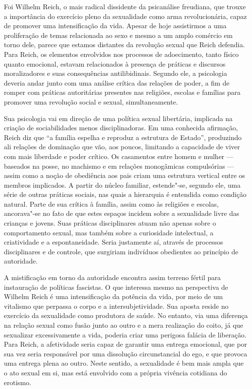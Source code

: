 Foi Wilhelm Reich, o mais radical dissidente da psicanálise freudiana,
que trouxe a importância do exercício pleno da sexualidade como arma
revolucionária, capaz de promover uma intensificação da vida. Apesar de
hoje assistirmos a uma proliferação de temas relacionada ao sexo e mesmo
a um amplo comércio em torno dele, parece que estamos distantes da
revolução sexual que Reich defendia. Para Reich, os elementos envolvidos
nos processos de adoecimento, tanto físico quanto emocional, estavam
relacionados à presença de práticas e discursos moralizadores e suas
consequências antilibidinais. Segundo ele, a psicologia deveria andar
junto com uma análise crítica das relações de poder, a fim de romper com
práticas autoritárias presentes nas religiões, escolas e famílias para
promover uma revolução social e sexual, simultaneamente.

Sua psicologia vai em direção de uma política sexual libertária,
implicada na criação de sociabilidades menos disciplinadoras. Em uma
conhecida afirmação, Reich diz que ``a família espelha e reproduz a
estrutura de Estado'', produzindo ali relações de dominação que vão, aos
poucos, limitando a capacidade de viver com mais liberdade e poder
crítico. Os casamentos entre homem e mulher --- baseados na posse, no
machismo e em relações monogâmicas compulsórias --- assim como a noção de
obediência aos pais criam uma estrutura vertical entre os membros
implicados. A partir do núcleo familiar, estende"-se, segundo ele, uma
série de outras práticas sociais, nas quais a hierarquia é entendida
como condição natural. Parte de sua crítica à família, assim como às
religiões e escolas, ancorava"-se no fato de que estes espaços incidem
sobre a sexualidade livre das crianças e jovens. Suas práticas
disciplinares atuam não apenas sobre o comportamento sexual, mas também
sobre a curiosidade intelectual, a criatividade e a espontaneidade.
Seria justamente aí, através de processos disciplinares e de controle,
que surgiriam indivíduos obedientes ao princípio de autoridade.

A mistificação em torno da autoridade encontra assim terreno fértil para
instauração de políticas fascistas. O que interessa mesmo na perspectiva
de Wilhelm Reich é uma intensificação da potência da vida, por meio de
um vitalismo que perpassa o corpo e a intersubjetividade. Sua aposta
reside no exercício da sexualidade como produtora de saúde. No entanto,
via uma diferença na relação sexual como fusão junto ao outro e a mera
realização do coito, já que sexualizar excessivamente a vida, poderia
criar uma perigosa falácia de liberação. Para Reich, a afetividade seria
capaz de garantir uma entrega emocional, que por sua vez seria
responsável por uma dissolução circunstancial do ego, e que provoca uma
entrega plena ao outro. Neste sentido, a sexualidade é bem mais ampla
que o ato sexual em si, mas está envolvido com a própria vivência
cotidiana do erotismo.

